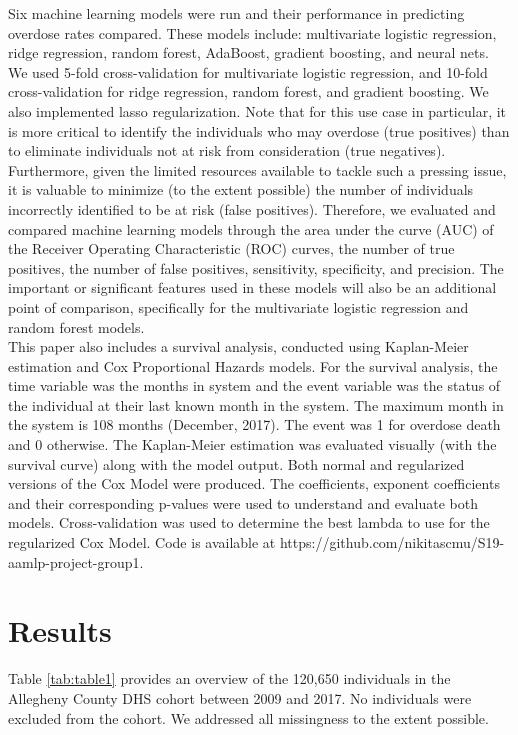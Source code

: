 \documentclass[twoside,10.5pt]{article}
\begin{document}
Six machine learning models were run and their performance in predicting overdose rates compared. These models include: multivariate logistic regression, ridge regression, random forest, AdaBoost, gradient boosting, and neural nets. We used 5-fold cross-validation for multivariate logistic regression, and 10-fold cross-validation for ridge regression, random forest, and gradient boosting. We also implemented lasso regularization. Note that for this use case in particular, it is more critical to identify the individuals who may overdose (true positives) than to eliminate individuals not at risk from consideration (true negatives). Furthermore, given the limited resources available to tackle such a pressing issue, it is valuable to minimize (to the extent possible) the number of individuals incorrectly identified to be at risk (false positives). Therefore, we evaluated and compared machine learning models through the area under the curve (AUC) of the Receiver Operating Characteristic (ROC) curves, the number of true positives, the number of false positives, sensitivity, specificity, and precision. The important or significant features used in these models will also be an additional point of comparison, specifically for the multivariate logistic regression and random forest models.\\

This paper also includes a survival analysis, conducted using Kaplan-Meier estimation and Cox Proportional Hazards models. For the survival analysis, the time variable was the months in system and the event variable was the status of the individual at their last known month in the system. The maximum month in the system is 108 months (December, 2017). The event was 1 for overdose death and 0 otherwise. The Kaplan-Meier estimation was evaluated visually (with the survival curve) along with the model output. Both normal and regularized versions of the Cox Model were produced. The coefficients, exponent coefficients and their corresponding p-values were used to understand and evaluate both models. Cross-validation was used to determine the best lambda to use for the regularized Cox Model. 
Code is available at https://github.com/nikitascmu/S19-aamlp-project-group1. 

\section{Results}

Table \ref{tab:table1} provides an overview of the 120,650 individuals in the Allegheny County DHS cohort between 2009 and 2017. No individuals were excluded from the cohort. We addressed all missingness to the extent possible.
\end{document}
